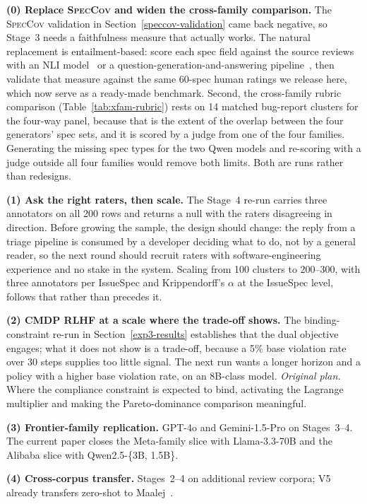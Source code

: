 \documentclass[sigconf, anonymous]{acmart}
\begin{document}
\textbf{(0) Replace \textsc{SpecCov} and widen the cross-family comparison.} The
\textsc{SpecCov} validation in Section~\ref{speccov-validation} came back negative, so Stage~3
needs a faithfulness measure that actually works. The natural replacement is entailment-based:
score each spec field against the source reviews with an NLI model~\cite{laban2022summac,
honovich2022true} or a question-generation-and-answering pipeline~\cite{durmus2020feqa}, then
validate that measure against the same 60-spec human ratings we release here, which now serve as
a ready-made benchmark. Second, the cross-family rubric comparison
(Table~\ref{tab:xfam-rubric}) rests on 14 matched bug-report clusters for the four-way panel,
because that is the extent of the overlap between the four generators' spec sets, and it is
scored by a judge from one of the four families. Generating the missing spec types for the two
Qwen models and re-scoring with a judge outside all four families would remove both limits.
Both are runs rather than redesigns.

\textbf{(1) Ask the right raters, then scale.} The Stage~4 re-run carries three annotators on all 200 rows and returns a null with the raters disagreeing in direction. Before growing the sample, the design should change: the reply from a triage pipeline is consumed by a developer deciding what to do, not by a general reader, so the next round should recruit raters with software-engineering experience and no stake in the system. Scaling from 100 clusters to 200--300, with three annotators per IssueSpec and Krippendorff's $\alpha$ at the IssueSpec level, follows that rather than precedes it.

\textbf{(2) CMDP RLHF at a scale where the trade-off shows.} The binding-constraint re-run in
Section~\ref{exp3-results} establishes that the dual objective engages; what it does not show is
a trade-off, because a 5\% base violation rate over 30 steps supplies too little signal. The next
run wants a longer horizon and a policy with a higher base violation rate, on an 8B-class model.
\emph{Original plan.} Where the compliance constraint is expected to bind, activating the Lagrange multiplier and making the Pareto-dominance comparison meaningful.

\textbf{(3) Frontier-family replication.} GPT-4o and Gemini-1.5-Pro on Stages~3--4. The current paper closes the Meta-family slice with Llama-3.3-70B and the Alibaba slice with Qwen2.5-\{3B, 1.5B\}.

\textbf{(4) Cross-corpus transfer.} Stages~2--4 on additional review corpora; V5 already transfers zero-shot to Maalej~\cite{maalej2015bug}.
\end{document}
